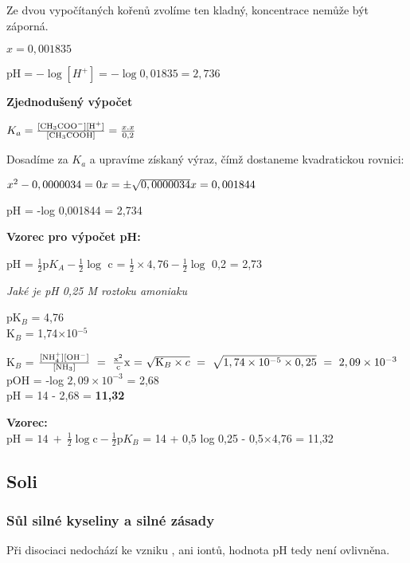 Ze dvou vypočítaných kořenů zvolíme ten kladný, koncentrace nemůže být záporná.

$x = 0,001835$

$\textrm{pH} = -\log[H^+] = -\log0,01835 = 2,736$

\textbf{Zjednodušený výpočet}

$K_a = \frac{[\ce{CH3COO^-}][\ce{H^+}]}{[\ce{CH3COOH}]} = \frac{x.x}{0,2}$

Dosadíme za $K_a$ a upravíme získaný výraz, čímž dostaneme kvadratickou rovnici:

$x^2 - 0,0000034 = 0\\
x = \pm\sqrt{0,0000034}\\
x = 0,001844$

pH = -log 0,001844 = 2,734

\textbf{Vzorec pro výpočet pH:}

pH = $\frac{1}{2}\textrm{p}K_A-\frac{1}{2}\log$ c = $\frac{1}{2}\times4,76 -\frac{1}{2}\log$ 0,2 = 2,73

\newpage

\textit{Jaké je pH 0,25 M roztoku amoniaku}


pK$_B$ = 4,76\\
K$_B$ = 1,74$\times$10$^{-5}$

K$_B$ = $\frac{[\ce{NH$^+_4$}][\ce{OH-}]}{[\ce{NH3}]}\ =\ \frac{\ce{x^2}}{\ce{c}}\\
\textrm{x = }\sqrt{\textrm{K}_B\times c}\ =\ \sqrt{1,74\times10^{-5}\times 0,25}\ =\ 2,09\times10^{-3}$\\
pOH = -log $2,09\times10^{-3}$ = 2,68\\
pH = 14 - 2,68 = \textbf{11,32}

\textbf{Vzorec:}\\
pH = $14\ +\ \frac{1}{2}\log\textrm{c} - \frac{1}{2}\textrm{p}K_B$ = 14 + 0,5 log 0,25 - 0,5$\times$4,76 = 11,32

\subsection{Soli}

\subsubsection{Sůl silné kyseliny a silné zásady}


Při disociaci nedochází ke vzniku , ani  iontů, hodnota pH tedy není ovlivněna.


